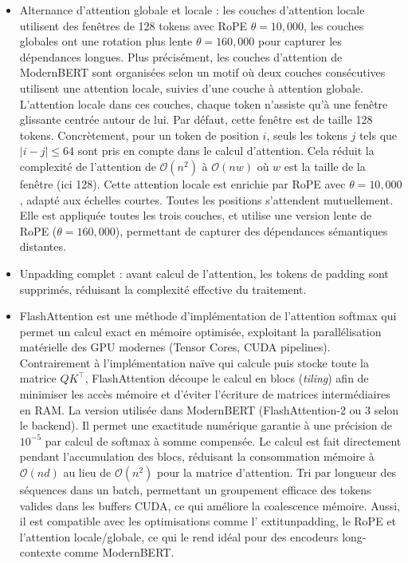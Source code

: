 \begin{itemize}
    \item Alternance d'attention globale et locale : les couches d'attention locale utilisent des fen\^etres de 128 tokens avec RoPE $\theta = 10{,}000$, les couches globales ont une rotation plus lente $\theta = 160{,}000$ pour capturer les dépendances longues. Plus précisément, les couches d'attention de ModernBERT sont organisées selon un motif où deux couches consécutives utilisent une attention locale, suivies d'une couche à attention globale. L'attention locale dans ces couches, chaque token n'assiste qu'à une fenêtre glissante centrée autour de lui. Par défaut, cette fenêtre est de taille 128 tokens. Concrètement, pour un token de position $i$, seuls les tokens $j$ tels que $|i - j| \leq 64$ sont pris en compte dans le calcul d'attention. Cela réduit la complexité de l'attention de $\mathcal{O}(n^2)$ à $\mathcal{O}(n w)$ où $w$ est la taille de la fenêtre (ici 128). Cette attention locale est enrichie par RoPE avec $\theta = 10{,}000$, adapté aux échelles courtes. Toutes les positions s'attendent mutuellement. Elle est appliquée toutes les trois couches, et utilise une version lente de RoPE ($\theta = 160{,}000$), permettant de capturer des dépendances sémantiques distantes.

    \item Unpadding complet : avant calcul de l'attention, les tokens de padding sont supprimés, réduisant la complexité effective du traitement.

    \item FlashAttention est une méthode d'implémentation de l'attention softmax qui permet un calcul exact en mémoire optimisée, exploitant la parallélisation matérielle des GPU modernes (Tensor Cores, CUDA pipelines). Contrairement à l'implémentation naïve qui calcule puis stocke toute la matrice $QK^\top$, FlashAttention découpe le calcul en blocs (\textit{tiling}) afin de minimiser les accès mémoire et d'éviter l'écriture de matrices intermédiaires en RAM. La version utilisée dans ModernBERT (FlashAttention-2 ou 3 selon le backend). Il permet une exactitude numérique garantie à une précision de $10^{-5}$ par calcul de softmax à somme compensée. Le calcul est fait directement pendant l'accumulation des blocs, réduisant la consommation mémoire à $\mathcal{O}(n d)$ au lieu de $\mathcal{O}(n^2)$ pour la matrice d'attention. Tri par longueur des séquences dans un batch, permettant un groupement efficace des tokens valides dans les buffers CUDA, ce qui améliore la coalescence mémoire. Aussi, il est compatible avec les optimisations comme l'	extit{unpadding}, le RoPE et l'attention locale/globale, ce qui le rend idéal pour des encodeurs long-contexte comme ModernBERT.
\end{itemize}

